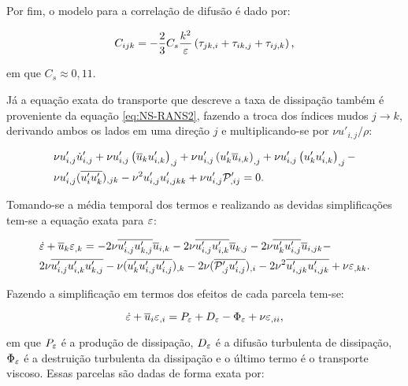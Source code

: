 \documentclass[_ArquivoPrincipal.tex]{subfiles}
\begin{document}
Por fim, o modelo para a correlação de difusão é dado por:

\begin{equation}
    C_{ijk}=-\frac{2}{3}C_s\frac{k^2}{\varepsilon}\left({\tau_{jk,i}+\tau_{ik,j}+\tau_{ij,k}}\right)\text{,}
\end{equation}

\noindent em que $C_s\approx0,11$.

Já a equação exata do transporte que descreve a taxa de dissipação também é proveniente da equação \ref{eq:NS-RANS2}, fazendo a troca dos índices mudos $j\to k$, derivando ambos os lados em uma direção $j$ e multiplicando-se por $\nu u'_{i,j}/\rho$:

\begin{equation}
    \begin{split}
        &\nu u'_{i,j}\dot{u}'_{i,j}+\nu u'_{i,j}\left({\overline{u}_ku'_{i,k}}\right)_{,j}+\nu u'_{i,j}\left({u'_k\overline{u}_{i,k}}\right)_{,j}+\nu u'_{i,j}\left({u'_ku'_{i,k}}\right)_{,j}-\\
        &\nu u'_{i,j}(\overline{u'_iu'_k})_{,jk}-\nu^2u'_{i,j}u'_{i,jkk}+\nu u'_{i,j}\mathcal{P}'_{,ij}=0\text{.}
    \end{split}
\end{equation}

Tomando-se a média temporal dos termos e realizando as devidas simplificações tem-se a equação exata para $\varepsilon$:

\begin{equation}
    \begin{split}
        &\dot{\varepsilon}+\overline{u}_k\varepsilon_{,k}=-2\nu\overline{u'_{i,j}u'_{k,j}}\overline{u}_{i,k}-2\nu\overline{u'_{i,j}u'_{i,k}}\overline{u}_{k,j}-2\nu\overline{u'_ku'_{i,j}}\overline{u}_{i,jk}-\\
        &2\nu\overline{u'_{i,j}u'_{i,k}u'_{k,j}}-\nu(\overline{u'_ku'_{i,j}u'_{i,j}})_{,k}-2\nu(\overline{\mathcal{P}'_{,j}u'_{i,j}})_{,i}-2\nu^2\overline{u'_{i,jk}u'_{i,jk}}+\nu\varepsilon_{,kk}\text{.}
    \end{split}
\end{equation}

Fazendo a simplificação em termos dos efeitos de cada parcela tem-se:

\begin{equation}
    \dot{\varepsilon}+\overline{u}_i\varepsilon_{,i}=P_\varepsilon+D_\varepsilon-\Phi_\varepsilon+\nu\varepsilon_{,ii}\text{,}
\end{equation}

\noindent em que $P_\varepsilon$ é a produção de dissipação, $D_\varepsilon$ é a difusão turbulenta de dissipação, $\Phi_\varepsilon$ é a destruição turbulenta da dissipação e o último termo é o transporte viscoso. Essas parcelas são dadas de forma exata por:
\end{document}

